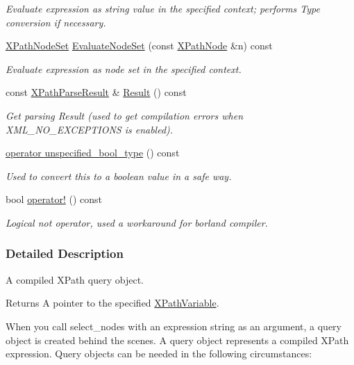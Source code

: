 \begin{DoxyCompactItemize}
\begin{DoxyCompactList}\small\item\em Evaluate expression as string value in the specified context; performs Type conversion if necessary. \item\end{DoxyCompactList}\item 
\hyperlink{classphys_1_1xml_1_1XPathNodeSet}{XPathNodeSet} \hyperlink{classphys_1_1xml_1_1XPathQuery_af00ba3d0346ccc01f249274947191333}{EvaluateNodeSet} (const \hyperlink{classphys_1_1xml_1_1XPathNode}{XPathNode} \&n) const 
\begin{DoxyCompactList}\small\item\em Evaluate expression as node set in the specified context. \item\end{DoxyCompactList}\item 
const \hyperlink{structphys_1_1xml_1_1XPathParseResult}{XPathParseResult} \& \hyperlink{classphys_1_1xml_1_1XPathQuery_a83f2039e91105c9cd0dcc7d524359198}{Result} () const 
\begin{DoxyCompactList}\small\item\em Get parsing Result (used to get compilation errors when XML\_\-NO\_\-EXCEPTIONS is enabled). \item\end{DoxyCompactList}\item 
\hyperlink{classphys_1_1xml_1_1XPathQuery_a1c6a8e78133a177792ade031f4ed0a89}{operator unspecified\_\-bool\_\-type} () const 
\begin{DoxyCompactList}\small\item\em Used to convert this to a boolean value in a safe way. \item\end{DoxyCompactList}\item 
bool \hyperlink{classphys_1_1xml_1_1XPathQuery_afe0b62e0ab607855f5267b0690bda33b}{operator!} () const 
\begin{DoxyCompactList}\small\item\em Logical not operator, used a workaround for borland compiler. \item\end{DoxyCompactList}\end{DoxyCompactItemize}


\subsubsection{Detailed Description}
A compiled XPath query object. \begin{DoxyReturn}{Returns}
A pointer to the specified \hyperlink{classphys_1_1xml_1_1XPathVariable}{XPathVariable}.
\end{DoxyReturn}
When you call select\_\-nodes with an expression string as an argument, a query object is created behind the scenes. A query object represents a compiled XPath expression. Query objects can be needed in the following circumstances: \par

